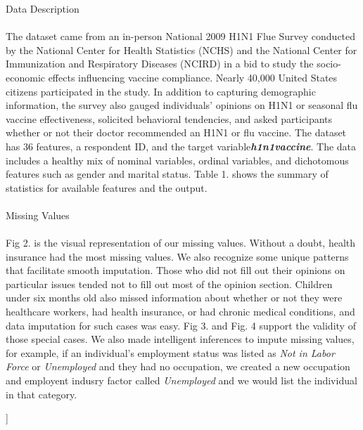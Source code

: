 \documentclass{IEEEtran}
\begin{document}
\begin{@twocolumnfalse}
{\huge Data Description}\\\\
The dataset came from an in-person National 2009 H1N1 Flue Survey conducted by the National Center for Health Statistics (NCHS) and the National Center for Immunization and Respiratory Diseases (NCIRD) in a bid to study the socio-economic effects influencing vaccine compliance. Nearly 40,000 United States citizens participated in the study.  In addition to capturing demographic information, the survey also gauged individuals' opinions on H1N1 or seasonal flu vaccine effectiveness, solicited behavioral tendencies, and asked participants whether or not their doctor recommended an H1N1 or flu vaccine.  The dataset has 36 features, a respondent ID, and the target variable\textemdash \textbf{\emph{h1n1\textunderscore vaccine}}. The data includes a healthy mix of nominal variables, ordinal variables, and dichotomous features such as gender and marital status.  Table 1. shows the summary of statistics for available features and the output.\\\\
{\huge Missing Values}\\\\ 
Fig 2. is the visual representation of our missing values. Without a doubt, health insurance had the most missing values. We also recognize some unique patterns that facilitate smooth imputation. Those who did not fill out their opinions on particular issues tended not to fill out most of the opinion section. Children under six months old also missed information about whether or not they were healthcare workers, had health insurance, or had chronic medical conditions, and data imputation for such cases was easy. Fig 3. and Fig. 4 support the validity of those special cases. We also made intelligent inferences to impute missing values, for example, if an individual's employment status was listed as \emph{Not in Labor Force} or \emph{Unemployed} and they had no occupation, we created a new occupation and employent indusry factor called \emph{Unemployed} and we would list the individual in that category.
\end{@twocolumnfalse}
]
\end{document}
